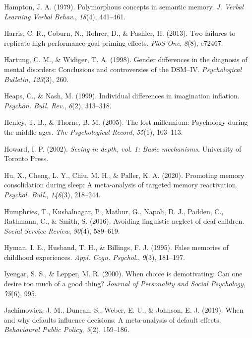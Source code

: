 \documentclass[
]{krantz}
\newlength{\cslhangindent}
\newenvironment{CSLReferences}[2] %
 {\begin{list}{}{%
  \setlength{\itemindent}{0pt}
  \setlength{\leftmargin}{0pt}
  \setlength{\parsep}{0pt}
  \ifodd #1
   \setlength{\leftmargin}{\cslhangindent}
   \setlength{\itemindent}{-1\cslhangindent}
  \fi
  \setlength{\itemsep}{#2\baselineskip}}}
 {\end{list}}
\begin{document}
\begin{CSLReferences}{1}{0}
Hampton, J. A. (1979). Polymorphous concepts in semantic memory. \emph{J. Verbal Learning Verbal Behav.}, \emph{18}(4), 441--461.

Harris, C. R., Coburn, N., Rohrer, D., \& Pashler, H. (2013). Two failures to replicate high-performance-goal priming effects. \emph{PloS One}, \emph{8}(8), e72467.

Hartung, C. M., \& Widiger, T. A. (1998). Gender differences in the diagnosis of mental disorders: Conclusions and controversies of the DSM--IV. \emph{Psychological Bulletin}, \emph{123}(3), 260.

Heaps, C., \& Nash, M. (1999). Individual differences in imagination inflation. \emph{Psychon. Bull. Rev.}, \emph{6}(2), 313--318.

Henley, T. B., \& Thorne, B. M. (2005). The lost millennium: Psychology during the middle ages. \emph{The Psychological Record}, \emph{55}(1), 103--113.

Howard, I. P. (2002). \emph{Seeing in depth, vol. 1: Basic mechanisms.} University of Toronto Press.

Hu, X., Cheng, L. Y., Chiu, M. H., \& Paller, K. A. (2020). Promoting memory consolidation during sleep: A meta-analysis of targeted memory reactivation. \emph{Psychol. Bull.}, \emph{146}(3), 218--244.

Humphries, T., Kushalnagar, P., Mathur, G., Napoli, D. J., Padden, C., Rathmann, C., \& Smith, S. (2016). Avoiding linguistic neglect of deaf children. \emph{Social Service Review}, \emph{90}(4), 589--619.

Hyman, I. E., Husband, T. H., \& Billings, F. J. (1995). False memories of childhood experiences. \emph{Appl. Cogn. Psychol.}, \emph{9}(3), 181--197.

Iyengar, S. S., \& Lepper, M. R. (2000). When choice is demotivating: Can one desire too much of a good thing? \emph{Journal of Personality and Social Psychology}, \emph{79}(6), 995.

Jachimowicz, J. M., Duncan, S., Weber, E. U., \& Johnson, E. J. (2019). When and why defaults influence decisions: A meta-analysis of default effects. \emph{Behavioural Public Policy}, \emph{3}(2), 159--186.


\end{CSLReferences}
\end{document}
